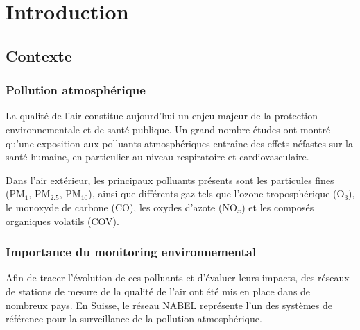 \chapter{Introduction}

\section{Contexte}
\subsection{Pollution atmosphérique}

La qualité de l'air constitue aujourd'hui un enjeu majeur de la protection environnementale et de santé publique. Un grand nombre études ont montré qu'une exposition aux polluants atmosphériques entraîne des effets néfastes sur la santé humaine, en particulier au niveau respiratoire et cardiovasculaire.

Dans l'air extérieur, les principaux polluants présents sont les particules fines (PM$_1$, PM$_{2.5}$, PM$_{10}$), ainsi que différents gaz tels que l'ozone troposphérique (O$_3$), le monoxyde de carbone (CO), les oxydes d'azote (NO$_x$) et les composés organiques volatils (COV).

\subsection{Importance du monitoring environnemental}
Afin de tracer l'évolution de ces polluants et d'évaluer leurs impacts, des réseaux de stations de mesure de la qualité de l'air ont été mis en place dans de nombreux pays. En Suisse, le réseau NABEL représente l'un des systèmes de référence pour la surveillance de la pollution atmosphérique.

